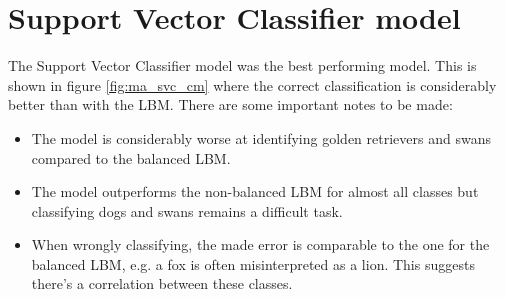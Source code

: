 
\section{Support Vector Classifier model}
\label{section:ma_svc_balanced}

The Support Vector Classifier model was the best performing model.
This is shown in figure \ref{fig:ma_svc_cm} where the correct classification is considerably better than with the LBM. There are some important notes to be made:
\begin{itemize}
    \item The model is considerably worse at identifying golden retrievers and swans compared to the balanced LBM.
    \item The model outperforms the non-balanced LBM for almost all classes but classifying dogs and swans remains a difficult task.
    \item When wrongly classifying, the made error is comparable to the one for the balanced LBM, e.g. a fox is often misinterpreted as a lion. This suggests there's a correlation between these classes.
\end{itemize}

